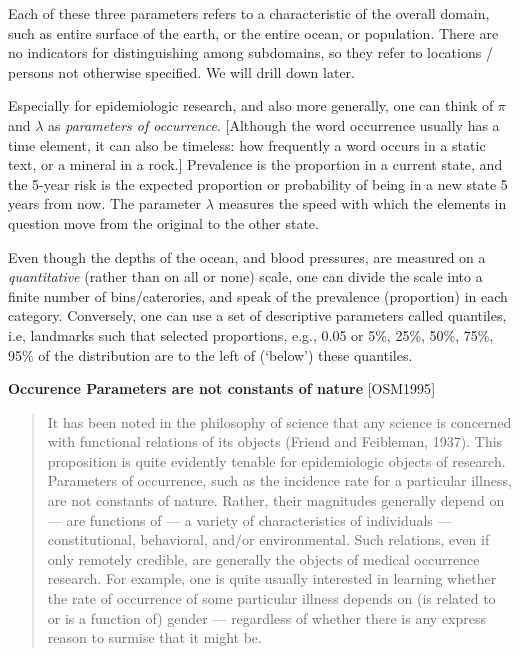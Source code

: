 \documentclass[]{book}
\begin{document}
Each of these three parameters refers to a characteristic of the overall domain, such as entire surface of the earth, or the entire ocean, or population. There are no indicators for distinguishing among subdomains, so they refer to locations / persons not otherwise specified. We will drill down later.

Especially for epidemiologic research, and also more generally, one can think of \(\pi\) and \(\lambda\) as \emph{parameters of occurrence}. {[}Although the word occurrence usually has a time element, it can also be timeless: how frequently a word occurs in a static text, or a mineral in a rock.{]} Prevalence is the proportion in a current state, and the 5-year risk is the expected proportion or probability of being in a new state 5 years from now. The parameter \(\lambda\) measures the speed with which the elements in question move from the original to the other state.

Even though the depths of the ocean, and blood pressures, are measured on a \emph{quantitative} (rather than on all or none) scale, one can divide the scale into a finite number of bins/caterories, and speak of the prevalence (proportion) in each category. Conversely, one can use a set of descriptive parameters called quantiles, i.e, landmarks such that selected proportions, e.g., 0.05 or 5\%, 25\%, 50\%, 75\%, 95\% of the distribution are to the left of (`below') these quantiles.

\textbf{Occurence Parameters are not constants of nature} {[}OSM1995{]}

\begin{quote}
It has been noted in the philosophy of science that any science is concerned with functional relations of its objects (Friend and Feibleman, 1937). This proposition is quite evidently tenable for epidemiologic objects of research. Parameters of occurrence, such as the incidence rate for a particular illness, are not constants of nature. Rather, their magnitudes generally depend on --- are functions of --- a variety of characteristics of individuals --- constitutional, behavioral, and/or environmental. Such relations, even if only remotely credible, are generally the objects of medical occurrence research. For example, one is quite usually interested in learning whether the rate of occurrence of some particular illness depends on (is related to or is a function of) gender --- regardless of whether there is any express reason to surmise that it might be.
\end{quote}
\end{document}
